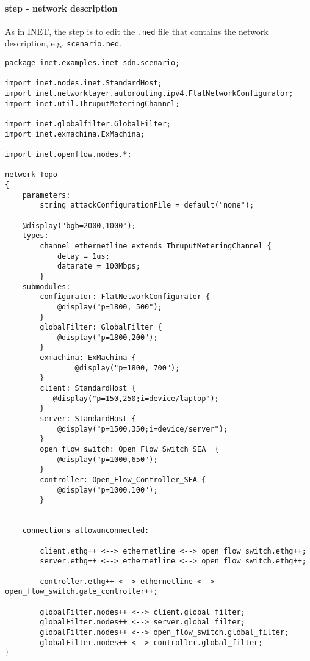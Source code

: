 \paragraph{ step - network description}
As in INET, the  step is to edit the \texttt{.ned} file that contains the network description, e.g. \texttt{scenario.ned}.
%
\begin{lstlisting}[language={ned}, caption={scenario.ned}, label={lst:build-scenario-ned}]
package inet.examples.inet_sdn.scenario;

import inet.nodes.inet.StandardHost;
import inet.networklayer.autorouting.ipv4.FlatNetworkConfigurator;
import inet.util.ThruputMeteringChannel;

import inet.globalfilter.GlobalFilter;
import inet.exmachina.ExMachina;

import inet.openflow.nodes.*;

network Topo
{
    parameters:		
        string attackConfigurationFile = default("none");
		
    @display("bgb=2000,1000");
    types:
        channel ethernetline extends ThruputMeteringChannel {
            delay = 1us;
            datarate = 100Mbps;
        }
	submodules:
        configurator: FlatNetworkConfigurator {
            @display("p=1800, 500");
        }
        globalFilter: GlobalFilter {
            @display("p=1800,200");
        }
        exmachina: ExMachina {
        		@display("p=1800, 700");
        }
        client: StandardHost {
           @display("p=150,250;i=device/laptop");
        }
        server: StandardHost {
            @display("p=1500,350;i=device/server");
        }      
        open_flow_switch: Open_Flow_Switch_SEA  {
            @display("p=1000,650");
        }
        controller: Open_Flow_Controller_SEA {
            @display("p=1000,100");
        }

        
	connections allowunconnected:
        
        client.ethg++ <--> ethernetline <--> open_flow_switch.ethg++;
        server.ethg++ <--> ethernetline <--> open_flow_switch.ethg++;
        
        controller.ethg++ <--> ethernetline <--> open_flow_switch.gate_controller++;
        
        globalFilter.nodes++ <--> client.global_filter;
        globalFilter.nodes++ <--> server.global_filter;
        globalFilter.nodes++ <--> open_flow_switch.global_filter;
        globalFilter.nodes++ <--> controller.global_filter;			
}
\end{lstlisting}

